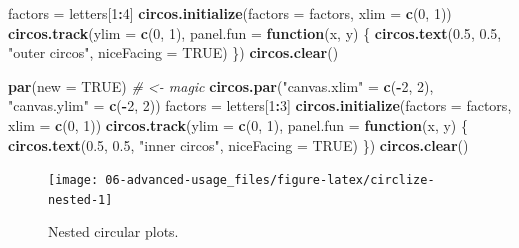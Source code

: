 \documentclass[]{book}
\newenvironment{Shaded}{\begin{snugshade}}{\end{snugshade}}
\newcommand{\KeywordTok}[1]{\textcolor[rgb]{0.13,0.29,0.53}{\textbf{#1}}}
\newcommand{\DataTypeTok}[1]{\textcolor[rgb]{0.13,0.29,0.53}{#1}}
\newcommand{\DecValTok}[1]{\textcolor[rgb]{0.00,0.00,0.81}{#1}}
\newcommand{\FloatTok}[1]{\textcolor[rgb]{0.00,0.00,0.81}{#1}}
\newcommand{\StringTok}[1]{\textcolor[rgb]{0.31,0.60,0.02}{#1}}
\newcommand{\CommentTok}[1]{\textcolor[rgb]{0.56,0.35,0.01}{\textit{#1}}}
\newcommand{\OtherTok}[1]{\textcolor[rgb]{0.56,0.35,0.01}{#1}}
\newcommand{\ControlFlowTok}[1]{\textcolor[rgb]{0.13,0.29,0.53}{\textbf{#1}}}
\newcommand{\OperatorTok}[1]{\textcolor[rgb]{0.81,0.36,0.00}{\textbf{#1}}}
\newcommand{\NormalTok}[1]{#1}
\theoremstyle{definition}
\theoremstyle{definition}
\theoremstyle{remark}
\begin{document}
\begin{Shaded}
\begin{Highlighting}[]
\NormalTok{factors =}\StringTok{ }\NormalTok{letters[}\DecValTok{1}\OperatorTok{:}\DecValTok{4}\NormalTok{]}
\KeywordTok{circos.initialize}\NormalTok{(}\DataTypeTok{factors =}\NormalTok{ factors, }\DataTypeTok{xlim =} \KeywordTok{c}\NormalTok{(}\DecValTok{0}\NormalTok{, }\DecValTok{1}\NormalTok{))}
\KeywordTok{circos.track}\NormalTok{(}\DataTypeTok{ylim =} \KeywordTok{c}\NormalTok{(}\DecValTok{0}\NormalTok{, }\DecValTok{1}\NormalTok{), }\DataTypeTok{panel.fun =} \ControlFlowTok{function}\NormalTok{(x, y) \{}
    \KeywordTok{circos.text}\NormalTok{(}\FloatTok{0.5}\NormalTok{, }\FloatTok{0.5}\NormalTok{, }\StringTok{"outer circos"}\NormalTok{, }\DataTypeTok{niceFacing =} \OtherTok{TRUE}\NormalTok{)}
\NormalTok{\})}
\KeywordTok{circos.clear}\NormalTok{()}

\KeywordTok{par}\NormalTok{(}\DataTypeTok{new =} \OtherTok{TRUE}\NormalTok{) }\CommentTok{# <- magic}
\KeywordTok{circos.par}\NormalTok{(}\StringTok{"canvas.xlim"}\NormalTok{ =}\StringTok{ }\KeywordTok{c}\NormalTok{(}\OperatorTok{-}\DecValTok{2}\NormalTok{, }\DecValTok{2}\NormalTok{), }\StringTok{"canvas.ylim"}\NormalTok{ =}\StringTok{ }\KeywordTok{c}\NormalTok{(}\OperatorTok{-}\DecValTok{2}\NormalTok{, }\DecValTok{2}\NormalTok{))}
\NormalTok{factors =}\StringTok{ }\NormalTok{letters[}\DecValTok{1}\OperatorTok{:}\DecValTok{3}\NormalTok{]}
\KeywordTok{circos.initialize}\NormalTok{(}\DataTypeTok{factors =}\NormalTok{ factors, }\DataTypeTok{xlim =} \KeywordTok{c}\NormalTok{(}\DecValTok{0}\NormalTok{, }\DecValTok{1}\NormalTok{))}
\KeywordTok{circos.track}\NormalTok{(}\DataTypeTok{ylim =} \KeywordTok{c}\NormalTok{(}\DecValTok{0}\NormalTok{, }\DecValTok{1}\NormalTok{), }\DataTypeTok{panel.fun =} \ControlFlowTok{function}\NormalTok{(x, y) \{}
    \KeywordTok{circos.text}\NormalTok{(}\FloatTok{0.5}\NormalTok{, }\FloatTok{0.5}\NormalTok{, }\StringTok{"inner circos"}\NormalTok{, }\DataTypeTok{niceFacing =} \OtherTok{TRUE}\NormalTok{)}
\NormalTok{\})}
\KeywordTok{circos.clear}\NormalTok{()}
\end{Highlighting}
\end{Shaded}

\begin{figure}

{\centering \texttt{[image: 06-advanced-usage\_files/figure-latex/circlize-nested-1]} 

}

\caption{Nested circular plots.}\label{fig:circlize-nested}
\end{figure}
\end{document}
